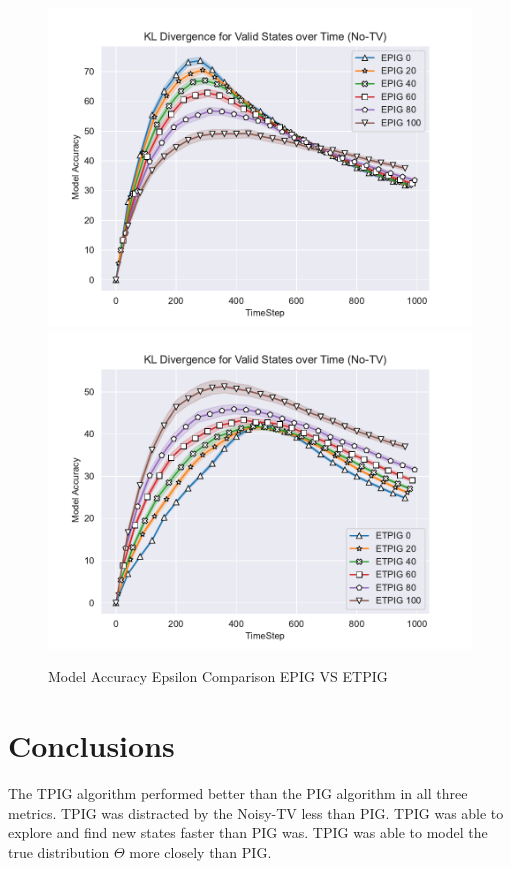\documentclass[12pt]{thesis}
\begin{document}
\begin{figure}[p]
	\includegraphics[scale=0.5]{"images/Epsilon_Model_Accuracy_EPIG_No-TV.pdf"}
	\includegraphics[scale=0.5]{"images/Epsilon_Model_Accuracy_ETPIG_No-TV.pdf"}
	\caption{Model Accuracy Epsilon Comparison EPIG VS ETPIG}
	\label{Fig:EAEC}
	
\end{figure}

\chapter{Conclusions}
The TPIG algorithm performed better than the PIG algorithm in all three metrics. TPIG was distracted by the Noisy-TV less than PIG. TPIG was able to explore and find new states faster than PIG was. TPIG was able to model the true distribution $\Theta$ more closely than PIG.
\end{document}
